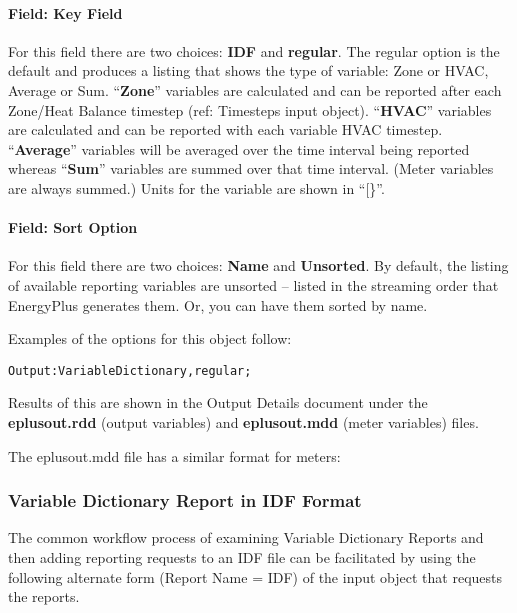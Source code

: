 \paragraph{Field: Key Field}\label{field-key-field}

For this field there are two choices: \textbf{IDF} and \textbf{regular}. The regular option is the default and produces a listing that shows the type of variable: Zone or HVAC, Average or Sum. ``\textbf{Zone}'' variables are calculated and can be reported after each Zone/Heat Balance timestep (ref: Timesteps input object). ``\textbf{HVAC}'' variables are calculated and can be reported with each variable HVAC timestep. ``\textbf{Average}'' variables will be averaged over the time interval being reported whereas ``\textbf{Sum}'' variables are summed over that time interval. (Meter variables are always summed.) Units for the variable are shown in ``{[}\}''.

\paragraph{Field: Sort Option}\label{field-sort-option}

For this field there are two choices: \textbf{Name} and \textbf{Unsorted}. By default, the listing of available reporting variables are unsorted -- listed in the streaming order that EnergyPlus generates them. Or, you can have them sorted by name.

Examples of the options for this object follow:

\begin{lstlisting}
Output:VariableDictionary,regular;
\end{lstlisting}

Results of this are shown in the Output Details document under the \textbf{eplusout.rdd} (output variables) and \textbf{eplusout.mdd} (meter variables) files.

The eplusout.mdd file has a similar format for meters:

\subsubsection{Variable Dictionary Report in IDF Format}\label{variable-dictionary-report-in-idf-format}

The common workflow process of examining Variable Dictionary Reports and then adding reporting requests to an IDF file can be facilitated by using the following alternate form (Report Name = IDF) of the input object that requests the reports.

